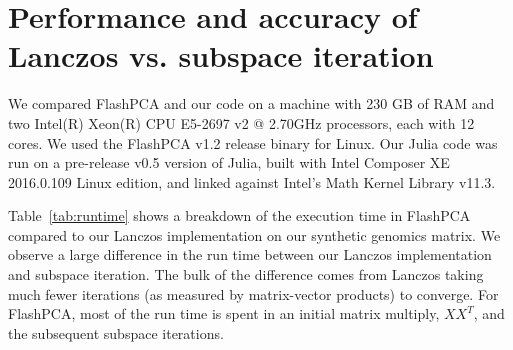 \documentclass[review]{siamart0516}
\begin{document}
%
%
%
%
%


\section{Performance and accuracy of Lanczos vs. subspace iteration}

We compared FlashPCA and our code on a machine with 230 GB of RAM and two
Intel(R) Xeon(R) CPU E5-2697 v2 @ 2.70GHz processors, each with 12 cores.
We used the FlashPCA v1.2 release binary for Linux.
Our Julia code was run on a pre-release v0.5 version of Julia,
built with Intel Composer XE 2016.0.109 Linux edition,
and linked against Intel's Math Kernel Library v11.3.

Table~\ref{tab:runtime} shows a breakdown of the execution time in FlashPCA
compared to our Lanczos implementation on our synthetic genomics matrix.
We observe a large difference in the run time between our Lanczos implementation
and subspace iteration.
The bulk of the difference comes from Lanczos taking much fewer iterations
(as measured by matrix-vector products) to converge. For FlashPCA, most of the
run time is spent in an initial matrix multiply, $XX^T$, and the subsequent
subspace iterations.
\end{document}

